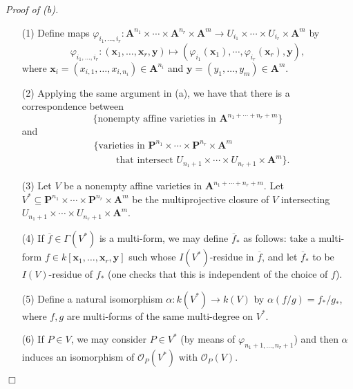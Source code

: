 \documentclass{article}
\begin{document}
\emph{Proof of (b).}
\begin{enumerate}
\item[(1)]
  Define maps
  $\varphi_{i_1,\ldots,i_r}:
    \mathbf{A}^{n_1} \times \cdots \times \mathbf{A}^{n_r} \times \mathbf{A}^{m}
    \to U_{i_1} \times \cdots \times U_{i_r} \times \mathbf{A}^{m}$
  by
  \[
    \varphi_{i_1,\ldots,i_r}:
    (\mathbf{x}_1, \ldots, \mathbf{x}_r, \mathbf{y})
    \mapsto
    (\varphi_{i_1}(\mathbf{x}_1), \cdots, \varphi_{i_r}(\mathbf{x}_r), \mathbf{y}),
  \]
  where $\mathbf{x}_i = (x_{i,1}, \ldots, x_{i,n_i}) \in \mathbf{A}^{n_i}$ and
  $\mathbf{y} = (y_1, \ldots, y_{m}) \in \mathbf{A}^{m}$.

\item[(2)]
  Applying the same argument in (a), we have that there is a correspondence between
  \[
    \{ \text{nonempty affine varieties in $\mathbf{A}^{n_1 + \cdots + n_r + m}$} \}
  \]
  and
  \begin{align*}
    & \{ \text{varieties in }
      \mathbf{P}^{n_1} \times \cdots \times \mathbf{P}^{n_r} \times \mathbf{A}^{m} \\
    & \qquad
      \text{ that intersect }
      U_{n_1+1} \times \cdots \times U_{n_r+1} \times \mathbf{A}^{m} \}.
  \end{align*}

\item[(3)]
  Let $V$ be a nonempty affine varieties in $\mathbf{A}^{n_1 + \cdots + n_r + m}$.
  Let $V^{*} \subseteq \mathbf{P}^{n_1} \times \cdots \times \mathbf{P}^{n_r} \times \mathbf{A}^{m}$
  be the multiprojective closure of $V$
  intersecting $U_{n_1+1} \times \cdots \times U_{n_r+1} \times \mathbf{A}^{m}$.

\item[(4)]
  If $\overline{f} \in \Gamma(V^{*})$ is a multi-form,
  we may define $\overline{f}_{*}$ as follows:
  take a multi-form $f \in k[\mathbf{x}_1,\ldots,\mathbf{x}_r,\mathbf{y}]$
  such whose $I(V^{*})$-residue in $\overline{f}$,
  and let $\overline{f}_{*}$ to be $I(V)$-residue of $f_{*}$
  (one checks that this is independent of the choice of $f$).

\item[(5)]
  Define a natural isomorphism $\alpha: k(V^{*}) \to k(V)$ by
  $\alpha(f/g) = f_{*}/g_{*}$,
  where $f, g$ are multi-forms of the same multi-degree on $V^{*}$.

\item[(6)]
  If $P \in V$, we may consider $P \in V^{*}$
  (by means of $\varphi_{n_1+1,\ldots,n_r+1}$) and then
  $\alpha$ induces an isomorphism of $\mathscr{O}_{P}(V^{*})$ with $\mathscr{O}_{P}(V)$.
\end{enumerate}
$\Box$ \\\\
\end{document}
